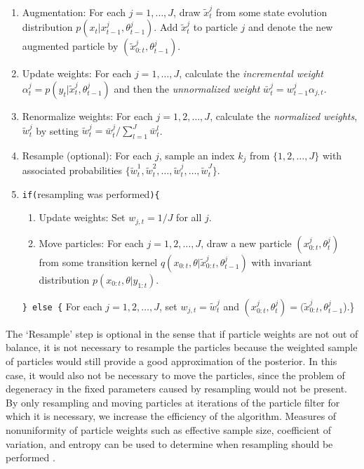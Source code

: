 \documentclass{article}
\begin{document}
\begin{enumerate}
\item Augmentation: For each $j = 1,\ldots,J$, draw $\tilde{x}^j_t$ from some state evolution distribution $p(x_t|x^j_{t-1},\theta^j_{t-1})$. Add $\tilde{x}^j_t$ to particle $j$ and denote the new augmented particle by $(\tilde{x}^j_{0:t},\theta^j_{t-1})$.
\item Update weights: For each $j = 1,\ldots,J$, calculate the \emph{incremental weight} $\alpha^j_t = p(y_t|\tilde{x}^j_t,\theta^j_{t-1})$ and then the \emph{unnormalized weight} $\bar{w}^j_t = w^j_{t-1}\alpha_{j,t}$.
\item Renormalize weights: For each $j = 1,2,\ldots,J$, calculate the \emph{normalized weights}, $\tilde{w}^j_t$ by setting $\tilde{w}^j_t = \bar{w}^j_t / \sum_{l=1}^J \bar{w}^l_t$.
\item Resample (optional): For each $j$, sample an index $k_j$ from $\{1,2,\ldots,J\}$ with associated probabilities $\{\tilde{w}^1_t,\tilde{w}^2_t,\ldots,\tilde{w}^j_t,\ldots,\tilde{w}^J_t\}$.
\item {\tt if(}resampling was performed{\tt )\{} \\
\begin{enumerate}[label=\alph*.]
\item Update weights: Set $w_{j,t} = 1 / J$ for all $j$.
\item Move particles: For each $j = 1,2,\ldots,J$, draw a new particle $(x^j_{0:t},\theta^j_t)$ from some transition kernel $q(x_{0:t},\theta|\tilde{x}^j_{0:t},\theta^j_{t-1})$ with invariant distribution $p(x_{0:t},\theta|y_{1:t})$.
\end{enumerate}
{\tt \} else \{} For each $j = 1,2,\ldots,J$, set $w_{j,t} = \tilde{w}^j_t$ and $(x^j_{0:t},\theta^j_t) = (\tilde{x}^j_{0:t},\theta^j_{t-1}$).\}
\end{enumerate}

The `Resample' step is optional in the sense that if particle weights are not out of balance, it is not necessary to resample the particles because the weighted sample of particles would still provide a good approximation of the posterior. In this case, it would also not be necessary to move the particles, since the problem of degeneracy in the fixed parameters caused by resampling would not be present. By only resampling and moving particles at iterations of the particle filter for which it is necessary, we increase the efficiency of the algorithm. Measures of nonuniformity of particle weights such as effective sample size, coefficient of variation, and entropy can be used to determine when resampling should be performed \citep{Liu:Chen:Wong:reje:1998}. %
\end{document}
